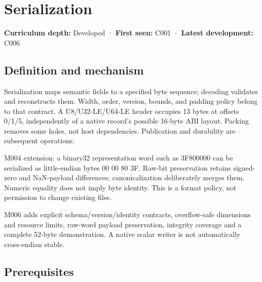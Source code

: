 \hypertarget{appendix-91d09ebed979}{}\label{referencestart:appendix-91d09ebed979}
\section{Serialization}\label{appendix-91d09ebed979-serialization}

\hypertarget{appendix-91d09ebed979-serialization}{}

\textbf{Curriculum depth:} Developed · \textbf{First seen:} C001 · \textbf{Latest development:} C006

\begin{allmightroledefinition}

\subsection{Definition and mechanism}\label{appendix-91d09ebed979-definition-and-mechanism}

\hypertarget{appendix-91d09ebed979-definition-and-mechanism}{}

Serialization maps semantic fields to a specified byte sequence; decoding validates and reconstructs them. Width, order, version, bounds, and padding policy belong to that contract. A U8/U32-LE/U64-LE header occupies 13 bytes at offsets 0/1/5, independently of a native record's possible 16-byte ABI layout. Packing removes some holes, not host dependencies. Publication and durability are subsequent operations.

\end{allmightroledefinition}

M004 extension: a binary32 representation word such as 3F800000 can be serialized as little-endian bytes 00 00 80 3F. Raw-bit preservation retains signed-zero and NaN-payload differences; canonicalization deliberately merges them. Numeric equality does not imply byte identity. This is a format policy, not permission to change existing files.

M006 adds explicit schema/version/identity contracts, overflow-safe dimensions and resource limits, raw-word payload preservation, integrity coverage and a complete 52-byte demonstration. A native scalar writer is not automatically cross-endian stable.

\subsection{Prerequisites}\label{appendix-91d09ebed979-prerequisites}

